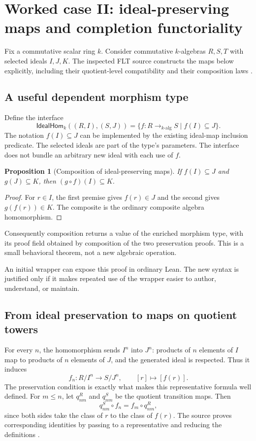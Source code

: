 \documentclass[11pt,a4paper]{article}
\theoremstyle{plain}
\newtheorem{proposition}{Proposition}[section]
\theoremstyle{definition}
\theoremstyle{remark}
\begin{document}
\section{Worked case II: ideal-preserving maps and completion functoriality}
\label{sec:completion}
Fix a commutative scalar ring $k$. Consider commutative $k$-algebras $R,S,T$
with selected ideals $I,J,K$. The inspected FLT source constructs the maps
below explicitly, including their quotient-level compatibility and their
composition laws \cite{completionsource}.

\subsection{A useful dependent morphism type}
Define the interface
\[
 \mathsf{IdealHom}_k((R,I),(S,J))
 =\{f:R\to_{k\text{-alg}}S\mid f(I)\subseteq J\}.
\]
The notation $f(I)\subseteq J$ can be implemented by the existing ideal-map
inclusion predicate. The selected ideals are part of the type's parameters.
The interface does not bundle an arbitrary new ideal with each use of $f$.

\begin{proposition}[Composition of ideal-preserving maps]
If $f(I)\subseteq J$ and $g(J)\subseteq K$, then
$(g\circ f)(I)\subseteq K$.
\end{proposition}
\begin{proof}
For $r\in I$, the first premise gives $f(r)\in J$ and the second gives
$g(f(r))\in K$. The composite is the ordinary composite algebra homomorphism.
\end{proof}
Consequently composition returns a value of the enriched morphism type,
with its proof field obtained by composition of the two preservation proofs.
This is a small behavioral theorem, not a new algebraic operation.

An initial wrapper can expose this proof in ordinary Lean. The new syntax is
justified only if it makes repeated use of the wrapper easier to author,
understand, or maintain.

\subsection{From ideal preservation to maps on quotient towers}
For every $n$, the homomorphism sends $I^n$ into $J^n$: products of $n$
elements of $I$ map to products of $n$ elements of $J$, and the generated
ideal is respected. Thus it induces
\[
 f_n:R/I^n\longrightarrow S/J^n,\qquad [r]\longmapsto[f(r)].
\]
The preservation condition is exactly what makes this representative formula
well defined. For $m\le n$, let $q^R_{nm}$ and $q^S_{nm}$ be the quotient
transition maps. Then
\[
 q^S_{nm}\circ f_n=f_m\circ q^R_{nm},
\]
since both sides take the class of $r$ to the class of $f(r)$. The source
proves corresponding identities by passing to a representative and reducing
the definitions \cite{completionsource}.
\end{document}
